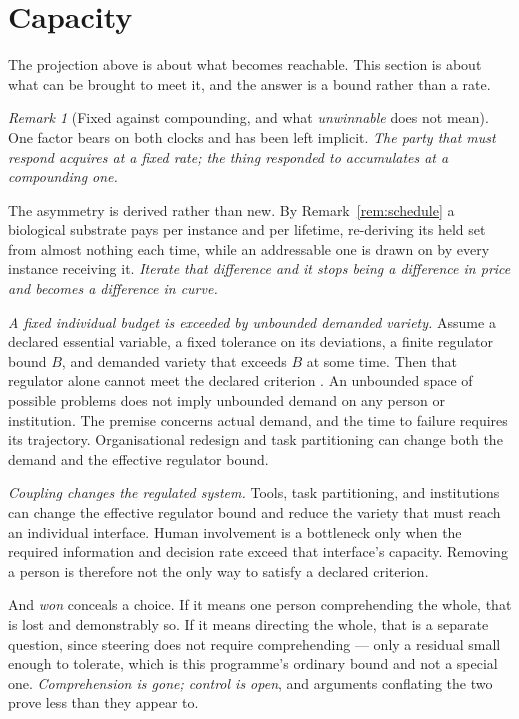 \documentclass[11pt,a4paper]{article}
\theoremstyle{remark}
\newtheorem{remark}[definition]{Remark}
\begin{document}
\section{Capacity}\label{sec:capacity}
The projection above is about what becomes reachable. This section is about what can be brought to
meet it, and the answer is a bound rather than a rate.

\begin{remark}[Fixed against compounding, and what \emph{unwinnable} does not mean]\label{rem:race}
One factor bears on both clocks and has been left implicit. \emph{The party that must respond acquires
at a fixed rate; the thing responded to accumulates at a compounding one.}

The asymmetry is derived rather than new. By Remark~\ref{rem:schedule} a biological substrate pays per
instance and per lifetime, re-deriving its held set from almost nothing each time, while an addressable
one is drawn on by every instance receiving it. \emph{Iterate that difference and it stops being a
difference in price and becomes a difference in curve.}

\emph{A fixed individual budget is exceeded by unbounded demanded variety.}
Assume a declared essential variable, a fixed tolerance on its deviations,
a finite regulator bound $B$, and demanded variety that exceeds $B$ at
some time. Then that regulator alone cannot meet the declared criterion
\citep{ashby1956}. An unbounded space of possible problems does not imply
unbounded demand on any person or institution. The premise concerns actual
demand, and the time to failure requires its trajectory. Organisational
redesign and task partitioning can change both the demand and the effective
regulator bound.

\emph{Coupling changes the regulated system.} Tools, task partitioning, and
institutions can change the effective regulator bound and reduce the variety
that must reach an individual interface. Human involvement is a bottleneck only
when the required information and decision rate exceed that interface's capacity.
Removing a person is therefore not the only way to satisfy a declared criterion.

And \emph{won} conceals a choice. If it means one person comprehending the whole, that is lost and
demonstrably so. If it means directing the whole, that is a separate question, since steering does not
require comprehending --- only a residual small enough to tolerate, which is this programme's ordinary
bound and not a special one. \emph{Comprehension is gone; control is open}, and arguments conflating the
two prove less than they appear to.


\end{remark}
\end{document}
